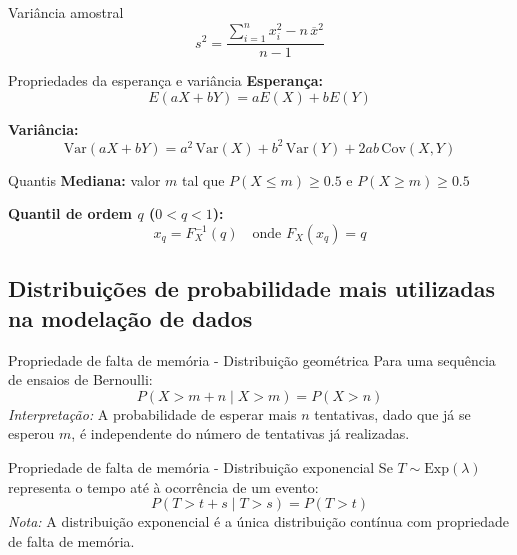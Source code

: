 \documentclass[a4paper,12pt]{article}
\begin{document}
\begin{formulabox}{Variância amostral}
\begin{equation}\label{formula8a}\tag{Fórmula 8a}
    s^2 = \frac{\sum_{i=1}^n x_i^2 - n\,\overline{x}^2}{n-1}
\end{equation}
\end{formulabox}

\begin{formulabox}{Propriedades da esperança e variância}
\textbf{Esperança:}
\begin{equation}\label{formula9}\tag{Fórmula 9}
    E(aX + bY) = aE(X) + bE(Y)
\end{equation}

\textbf{Variância:}
\begin{equation}\label{formula10}\tag{Fórmula 10}
    \mathrm{Var}(aX + bY) = a^2 \, \mathrm{Var}(X) + b^2 \, \mathrm{Var}(Y) + 2ab\,\mathrm{Cov}(X, Y)
\end{equation}
\end{formulabox}

\begin{formulabox}{Quantis}
\textbf{Mediana:} valor $m$ tal que $P(X \leq m) \geq 0.5$ e $P(X \geq m) \geq 0.5$

\textbf{Quantil de ordem $q$ ($0 < q < 1$):}
\begin{equation}\label{formula11}\tag{Fórmula 11}
    x_q = F_X^{-1}(q) \quad \text{onde } F_X(x_q) = q
\end{equation}
\end{formulabox}

\subsection{Distribuições de probabilidade mais utilizadas na modelação de dados}

\begin{formulabox}{Propriedade de falta de memória - Distribuição geométrica}
Para uma sequência de ensaios de Bernoulli:
\begin{equation}\label{formula12}\tag{Fórmula 12}
    P(X > m + n \mid X > m) = P(X > n)
\end{equation}
\textit{Interpretação:} A probabilidade de esperar mais $n$ tentativas, dado que já se esperou $m$, é independente do número de tentativas já realizadas.
\end{formulabox}

\begin{formulabox}{Propriedade de falta de memória - Distribuição exponencial}
Se $T \sim \mathrm{Exp}(\lambda)$ representa o tempo até à ocorrência de um evento:
\begin{equation}\label{formula13}\tag{Fórmula 13}
    P(T > t + s \mid T > s) = P(T > t)
\end{equation}
\textit{Nota:} A distribuição exponencial é a única distribuição contínua com propriedade de falta de memória.
\end{formulabox}
\end{document}
